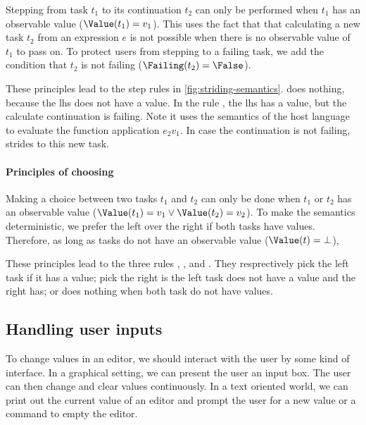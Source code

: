 Stepping from task $t_1$ to its continuation $t_2$ can only be performed when
$t_1$ has an observable value ($\Value(t_1) = v_1$).
This uses the fact that that calculating a new task $t_2$ from an expression $e$
is not possible when there is no observable value of $t_1$ to pass on.
To protect users from stepping to a failing task,
we add the condition that $t_2$ is not failing ($\Failing(t_2) = \False$).

These principles lead to the step rules in \cref{fig:striding-semantics}.
 does nothing,
because the lhs does not have a value.
In the rule ,
the lhs has a value, but the calculate continuation is failing.
Note it uses the semantics of the host language to evaluate the function application $e_2 v_1$.
In case the continuation is not failing,
 strides to this new task.



\paragraph{Principles of choosing}
\label{sub:choosing-principles}

Making a choice between two tasks $t_1$ and $t_2$ can only be done when
$t_1$ or $t_2$ has an observable value ($\Value(t_1) = v_1 \lor \Value(t_2) = v_2$).
To make the semantics deterministic,
we prefer the left over the right if both tasks have values.
Therefore, as long as tasks do not have an observable value ($\Value(t) = \bot$),

These principles lead to the three rules , , and .
They resprectively pick the left task if it has a value;
pick the right is the left task does not have a value and the right has;
or does nothing when both task do not have values.



\subsection{Handling user inputs}
\label{sec:handling}

To change values in an editor,
we should interact with the user by some kind of interface.
In a graphical setting,
we can present the user an input box.
The user can then change and clear values continuously.
In a text oriented world,
we can print out the current value of an editor
and prompt the user for a new value
or a command to empty the editor.

